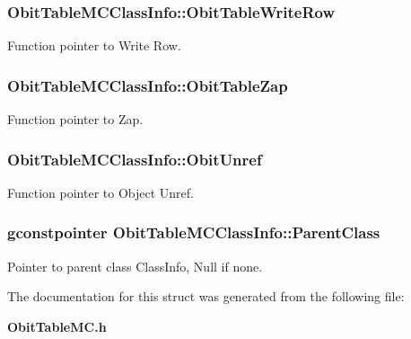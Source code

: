 \subsubsection{ {\bf Obit\-Table\-MCClass\-Info::Obit\-Table\-Write\-Row}}\label{structObitTableMCClassInfo_o26}


Function pointer to Write Row. 

\subsubsection{ {\bf Obit\-Table\-MCClass\-Info::Obit\-Table\-Zap}}\label{structObitTableMCClassInfo_o19}


Function pointer to Zap. 

\subsubsection{ {\bf Obit\-Table\-MCClass\-Info::Obit\-Unref}}\label{structObitTableMCClassInfo_o11}


Function pointer to Object Unref. 

\subsubsection{\setlength{\rightskip}{0pt plus 5cm}gconstpointer {\bf Obit\-Table\-MCClass\-Info::Parent\-Class}}\label{structObitTableMCClassInfo_o3}


Pointer to parent class Class\-Info, Null if none. 



The documentation for this struct was generated from the following file:\begin{CompactItemize}
\item 
{\bf Obit\-Table\-MC.h}\end{CompactItemize}
